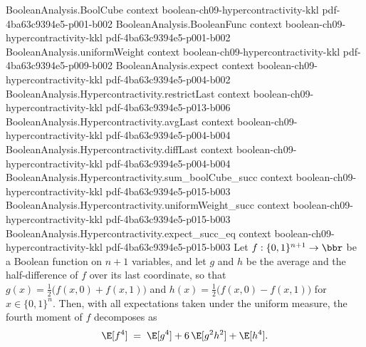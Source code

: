 \begin{lemma}
\label{BooleanAnalysis.Hypercontractivity.fourth_moment_decomp}
\leanok
{}
\proofstep
  {BooleanAnalysis.BoolCube}
  {context}
  {boolean-ch09-hypercontractivity-kkl}
  {pdf-4ba63c9394e5-p001-b002}
\proofstep
  {BooleanAnalysis.BooleanFunc}
  {context}
  {boolean-ch09-hypercontractivity-kkl}
  {pdf-4ba63c9394e5-p001-b002}
\proofstep
  {BooleanAnalysis.uniformWeight}
  {context}
  {boolean-ch09-hypercontractivity-kkl}
  {pdf-4ba63c9394e5-p009-b002}
\proofstep
  {BooleanAnalysis.expect}
  {context}
  {boolean-ch09-hypercontractivity-kkl}
  {pdf-4ba63c9394e5-p004-b002}
\proofstep
  {BooleanAnalysis.Hypercontractivity.restrictLast}
  {context}
  {boolean-ch09-hypercontractivity-kkl}
  {pdf-4ba63c9394e5-p013-b006}
\proofstep
  {BooleanAnalysis.Hypercontractivity.avgLast}
  {context}
  {boolean-ch09-hypercontractivity-kkl}
  {pdf-4ba63c9394e5-p004-b004}
\proofstep
  {BooleanAnalysis.Hypercontractivity.diffLast}
  {context}
  {boolean-ch09-hypercontractivity-kkl}
  {pdf-4ba63c9394e5-p004-b004}
\proofstep
  {BooleanAnalysis.Hypercontractivity.sum_boolCube_succ}
  {context}
  {boolean-ch09-hypercontractivity-kkl}
  {pdf-4ba63c9394e5-p015-b003}
\proofstep
  {BooleanAnalysis.Hypercontractivity.uniformWeight_succ}
  {context}
  {boolean-ch09-hypercontractivity-kkl}
  {pdf-4ba63c9394e5-p015-b003}
\proofstep
  {BooleanAnalysis.Hypercontractivity.expect_succ_eq}
  {context}
  {boolean-ch09-hypercontractivity-kkl}
  {pdf-4ba63c9394e5-p015-b003}
Let $f : \{0,1\}^{n+1} \to \bbr$ be a Boolean function on $n+1$ variables, and let $g$
and $h$ be the average and the half-difference of $f$ over its last coordinate, so that
$g(x) = \tfrac12\bigl(f(x,0) + f(x,1)\bigr)$ and $h(x) = \tfrac12\bigl(f(x,0) -
f(x,1)\bigr)$ for $x \in \{0,1\}^n$. Then, with all expectations taken under the uniform
measure, the fourth moment of $f$ decomposes as
\[
\E[f^4] \;=\; \E[g^4] + 6\,\E[g^2 h^2] + \E[h^4].
\]
\end{lemma}

